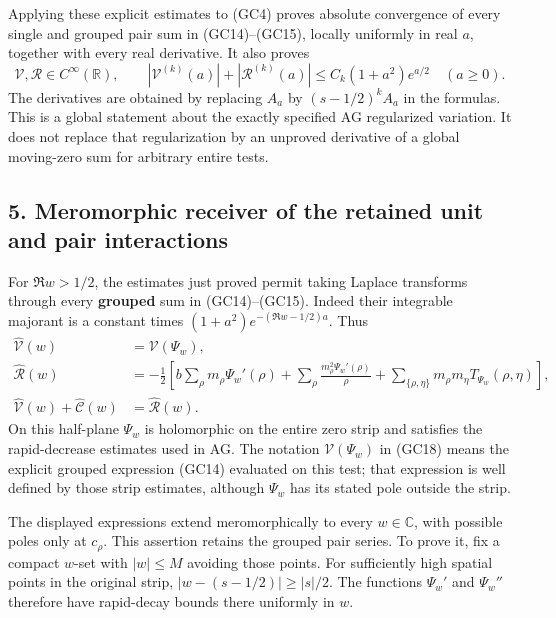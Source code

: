 \documentclass[
  10pt,
  a4paper,
]{article}
\begin{document}
Applying these explicit estimates to (GC4) proves absolute convergence
of every single and grouped pair sum in (GC14)--(GC15), locally
uniformly in real \(a\), together with every real derivative. It also
proves \[
\mathcal V,\mathcal R\in C^\infty(\mathbb R),\qquad
|\mathcal V^{(k)}(a)|+|\mathcal R^{(k)}(a)|
\le C_k(1+a^2)e^{a/2}\quad(a\ge0).
\tag{GC17}
\] The derivatives are obtained by replacing \(A_a\) by \((s-1/2)^kA_a\)
in the formulas. This is a global statement about the exactly specified
AG regularized variation. It does not replace that regularization by an
unproved derivative of a global moving-zero sum for arbitrary entire
tests.

\subsection{5. Meromorphic receiver of the retained unit and pair
interactions}\label{meromorphic-receiver-of-the-retained-unit-and-pair-interactions}

For \(\Re w>1/2\), the estimates just proved permit taking Laplace
transforms through every \textbf{grouped} sum in (GC14)--(GC15). Indeed
their integrable majorant is a constant times
\((1+a^2)e^{-(\Re w-1/2)a}\). Thus \[
\begin{aligned}
\widehat{\mathcal V}(w)&=\mathcal V(\Psi_w),\\
\widehat{\mathcal R}(w)&=
-\frac12\left[
b\sum_\rho m_\rho\Psi_w'(\rho)
+\sum_\rho\frac{m_\rho^2\Psi_w'(\rho)}{\rho}
+\sum_{\{\rho,\eta\}}m_\rho m_\eta T_{\Psi_w}(\rho,\eta)
\right],\\
\widehat{\mathcal V}(w)+\widehat{\mathcal C}(w)
&=\widehat{\mathcal R}(w).
\end{aligned}
\tag{GC18}
\] On this half-plane \(\Psi_w\) is holomorphic on the entire zero strip
and satisfies the rapid-decrease estimates used in AG. The notation
\(\mathcal V(\Psi_w)\) in (GC18) means the explicit grouped expression
(GC14) evaluated on this test; that expression is well defined by those
strip estimates, although \(\Psi_w\) has its stated pole outside the
strip.

The displayed expressions extend meromorphically to every
\(w\in\mathbb C\), with possible poles only at \(c_\rho\). This
assertion retains the grouped pair series. To prove it, fix a compact
\(w\)-set with \(|w|\le M\) avoiding those points. For sufficiently high
spatial points in the original strip, \(|w-(s-1/2)|\ge |s|/2\). The
functions \(\Psi_w'\) and \(\Psi_w''\) therefore have rapid-decay bounds
there uniformly in \(w\).
\end{document}
